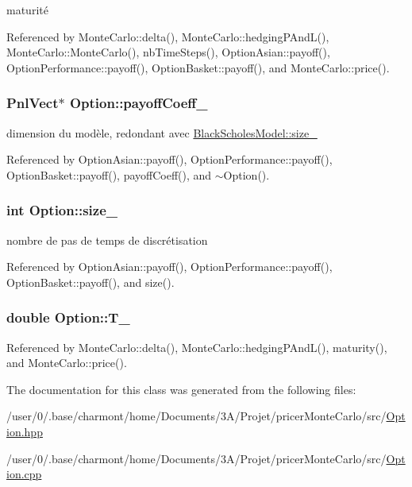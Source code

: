 maturité 



Referenced by Monte\-Carlo\-::delta(), Monte\-Carlo\-::hedging\-P\-And\-L(), Monte\-Carlo\-::\-Monte\-Carlo(), nb\-Time\-Steps(), Option\-Asian\-::payoff(), Option\-Performance\-::payoff(), Option\-Basket\-::payoff(), and Monte\-Carlo\-::price().

\hypertarget{classOption_ae39676c75e7c6592cfcead8abe48b71b}{
\subsubsection[{payoff\-Coeff\-\_\-}]{\setlength{\rightskip}{0pt plus 5cm}Pnl\-Vect$\ast$ Option\-::payoff\-Coeff\-\_\-}}\label{classOption_ae39676c75e7c6592cfcead8abe48b71b}


dimension du modèle, redondant avec \hyperlink{classBlackScholesModel_ab84e9318c0c1e8a50d5e2f9a70f1256e}{Black\-Scholes\-Model\-::size\-\_\-} 



Referenced by Option\-Asian\-::payoff(), Option\-Performance\-::payoff(), Option\-Basket\-::payoff(), payoff\-Coeff(), and $\sim$\-Option().

\hypertarget{classOption_a65fae5103b50f953f29a86b1a17b4540}{
\subsubsection[{size\-\_\-}]{\setlength{\rightskip}{0pt plus 5cm}int Option\-::size\-\_\-}}\label{classOption_a65fae5103b50f953f29a86b1a17b4540}


nombre de pas de temps de discrétisation 



Referenced by Option\-Asian\-::payoff(), Option\-Performance\-::payoff(), Option\-Basket\-::payoff(), and size().

\hypertarget{classOption_a89f0365b68626cc5eb523f12159e0764}{
\subsubsection[{T\-\_\-}]{\setlength{\rightskip}{0pt plus 5cm}double Option\-::\-T\-\_\-}}\label{classOption_a89f0365b68626cc5eb523f12159e0764}


Referenced by Monte\-Carlo\-::delta(), Monte\-Carlo\-::hedging\-P\-And\-L(), maturity(), and Monte\-Carlo\-::price().



The documentation for this class was generated from the following files\-:\begin{DoxyCompactItemize}
\item 
/user/0/.\-base/charmont/home/\-Documents/3\-A/\-Projet/pricer\-Monte\-Carlo/src/\hyperlink{Option_8hpp}{Option.\-hpp}\item 
/user/0/.\-base/charmont/home/\-Documents/3\-A/\-Projet/pricer\-Monte\-Carlo/src/\hyperlink{Option_8cpp}{Option.\-cpp}\end{DoxyCompactItemize}
